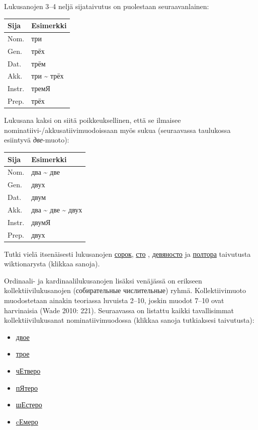 \documentclass[]{scrartcl}
\providecommand{\tightlist}{%
  \setlength{\itemsep}{0pt}\setlength{\parskip}{0pt}}
\begin{document}
Lukusanojen 3--4 neljä sijataivutus on puolestaan seuraavanlainen:

\begin{longtable}[c]{@{}ll@{}}
\toprule
Sija & Esimerkki\tabularnewline
\midrule
\endhead
Nom. & три\tabularnewline
Gen. & трёх\tabularnewline
Dat. & трём\tabularnewline
Akk. & три \textasciitilde{} трёх\tabularnewline
Instr. & тремЯ\tabularnewline
Prep. & трёх\tabularnewline
\bottomrule
\end{longtable}

Lukusana kaksi on siitä poikkeuksellinen, että se ilmaisee
nominatiivi-/akkusatiivimuodoissaan myös sukua (seuraavassa taulukossa
esiintyvä \emph{две}-muoto):

\begin{longtable}[c]{@{}ll@{}}
\toprule
Sija & Esimerkki\tabularnewline
\midrule
\endhead
Nom. & два \textasciitilde{} две\tabularnewline
Gen. & двух\tabularnewline
Dat. & двум\tabularnewline
Akk. & два \textasciitilde{} две \textasciitilde{} двух\tabularnewline
Instr. & двумЯ\tabularnewline
Prep. & двух\tabularnewline
\bottomrule
\end{longtable}

Tutki vielä itsenäisesti lukusanojen
\href{https://ru.wiktionary.org/wiki/\%D1\%81\%D0\%BE\%D1\%80\%D0\%BE\%D0\%BA}{сорок},
\href{https://ru.wiktionary.org/wiki/\%D1\%81\%D1\%82\%D0\%BE}{сто} ,
\href{https://ru.wiktionary.org/wiki/\%D0\%B4\%D0\%B5\%D0\%B2\%D1\%8F\%D0\%BD\%D0\%BE\%D1\%81\%D1\%82\%D0\%BE}{девяносто}
ja
\href{https://ru.wiktionary.org/wiki/\%D0\%BF\%D0\%BE\%D0\%BB\%D1\%82\%D0\%BE\%D1\%80\%D0\%B0}{полтора}
taivutusta wiktionarysta (klikkaa sanoja).

Ordinaali- ja kardinaalilukusanojen lisäksi venäjässä on erikseen
kollektiivilukusanojen (собирательные числительные) ryhmä.
Kollektiivimuoto muodostetaan ainakin teoriassa luvuista 2--10, joskin
muodot 7--10 ovat harvinaisia (Wade 2010: 221). Seuraavassa on listattu
kaikki tavallisimmat kollektiivilukusanat nominatiivimuodossa (klikkaa
sanoja tutkiaksesi taivutusta):

\begin{itemize}
\tightlist
\item
  \href{https://ru.wiktionary.org/wiki/\%D0\%B4\%D0\%B2\%D0\%BE\%D0\%B5}{двое}
\item
  \href{https://ru.wiktionary.org/wiki/\%D1\%82\%D1\%80\%D0\%BE\%D0\%B5}{трое}
\item
  \href{https://ru.wiktionary.org/wiki/\%D1\%87\%D0\%B5\%D1\%82\%D0\%B2\%D0\%B5\%D1\%80\%D0\%BE}{чЕтверо}
\item
  \href{https://ru.wiktionary.org/wiki/\%D0\%BF\%D1\%8F\%D1\%82\%D0\%B5\%D1\%80\%D0\%BE}{пЯтеро}
\item
  \href{https://ru.wiktionary.org/wiki/\%D1\%88\%D0\%B5\%D1\%81\%D1\%82\%D0\%B5\%D1\%80\%D0\%BE}{шЕстеро}
\item
  \href{https://ru.wiktionary.org/wiki/cемеро}{cЕмеро}
\end{itemize}
\end{document}

